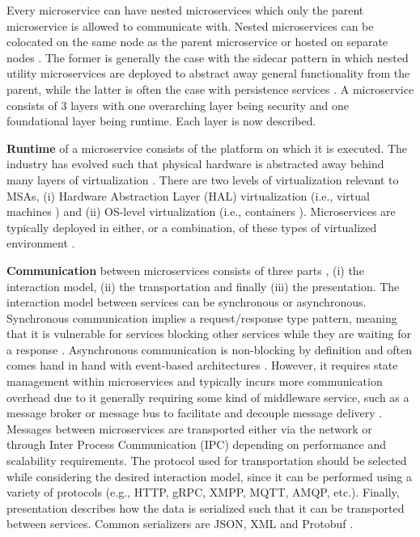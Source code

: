 Every microservice can have nested microservices which only the parent microservice is allowed to communicate with. Nested microservices can be colocated on the same node as the parent microservice or hosted on separate nodes \cite{richardson2018microservices}. The former is generally the case with the sidecar pattern in which nested utility microservices are deployed to abstract away general functionality from the parent, while the latter is often the case with persistence services \cite{5-newman2021building,richardson2018microservices}.
A microservice consists of 3 layers with one overarching layer being security \cite{Garriga2018203,richardson2018microservices,Sill201676,5-newman2021building} and one foundational layer being runtime. Each layer is now described.

\textbf{Runtime} of a microservice consists of the platform on which it is executed. The industry has evolved such that physical hardware is abstracted away behind many layers of virtualization \cite{richardson2018microservices}. There are two levels of virtualization relevant to MSAs, (i) Hardware Abstraction Layer (HAL) virtualization (i.e., virtual machines \cite{richardson2018microservices}) and (ii) OS-level virtualization (i.e., containers \cite{Jaramillo2016,richardson2018microservices}). Microservices are typically deployed in either, or a combination, of these types of virtualized environment \cite{DiFrancesco201977}.

\textbf{Communication} between microservices consists of three parts \cite{Sill201676}, (i) the interaction model, (ii) the transportation and finally (iii) the presentation. The interaction model between services can be synchronous or asynchronous. Synchronous communication implies a request/response type pattern, meaning that it is vulnerable for services blocking other services while they are waiting for a response \cite{5-newman2021building, richardson2018microservices, IBMBook}. Asynchronous communication is non-blocking by definition and often comes hand in hand with event-based architectures \cite{Unlu2021244}. However, it requires state management within microservices and typically incurs more communication overhead due to it generally requiring some kind of middleware service, such as a message broker or message bus to facilitate and decouple message delivery \cite{richardson2018microservices, middleware, IBMBook}. Messages between microservices are transported either via the network or through Inter Process Communication (IPC) depending on performance and scalability requirements. The protocol used for transportation should be selected while considering the desired interaction model, since it can be performed using a variety of protocols \cite{Sill201676} (e.g., HTTP, gRPC, XMPP, MQTT, AMQP, etc.). Finally, presentation describes how the data is serialized such that it can be transported between services. Common serializers are JSON, XML and Protobuf \cite{richardson2018microservices}.

